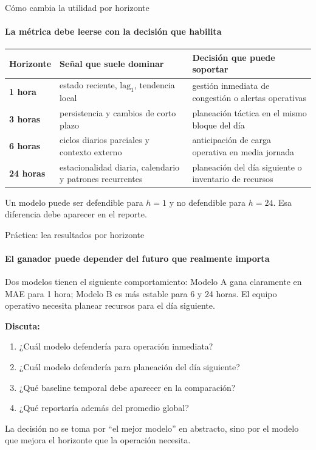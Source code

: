 \documentclass[aspectratio=169,11pt]{beamer}  %
\newcommand{\hrow}{\rowcolor{mlcream}}
\begin{document}
\begin{frame}{Cómo cambia la utilidad por horizonte}
\framesubtitle{La métrica debe leerse con la decisión que habilita}
\centering
\begin{tabular}{@{}l P{0.39\textwidth} P{0.40\textwidth}@{}}
\toprule
\hrow \textbf{Horizonte} & Señal que suele dominar & Decisión que puede soportar\\
\midrule
\textbf{1 hora} & estado reciente, $\mathrm{lag}_1$, tendencia local & gestión inmediata de congestión o alertas operativas\\
\textbf{3 horas} & persistencia y cambios de corto plazo & planeación táctica en el mismo bloque del día\\
\textbf{6 horas} & ciclos diarios parciales y contexto externo & anticipación de carga operativa en media jornada\\
\textbf{24 horas} & estacionalidad diaria, calendario y patrones recurrentes & planeación del día siguiente o inventario de recursos\\
\bottomrule
\end{tabular}

\vspace{0.3em}\raggedright
Un modelo puede ser defendible para $h=1$ y no defendible para $h=24$. Esa diferencia debe aparecer en el reporte.
\end{frame}

\begin{frame}{Práctica: lea resultados por horizonte}
\framesubtitle{El ganador puede depender del futuro que realmente importa}
\begin{taskbox}
Dos modelos tienen el siguiente comportamiento: Modelo A gana claramente en MAE para 1 hora; Modelo B es más estable para 6 y 24 horas. El equipo operativo necesita planear recursos para el día siguiente.
\end{taskbox}
\textbf{Discuta:}
\begin{enumerate}
\item ¿Cuál modelo defendería para operación inmediata?
\item ¿Cuál modelo defendería para planeación del día siguiente?
\item ¿Qué baseline temporal debe aparecer en la comparación?
\item ¿Qué reportaría además del promedio global?
\end{enumerate}
La decisión no se toma por ``el mejor modelo'' en abstracto, sino por el modelo que mejora el horizonte que la operación necesita.
\end{frame}
\end{document}
